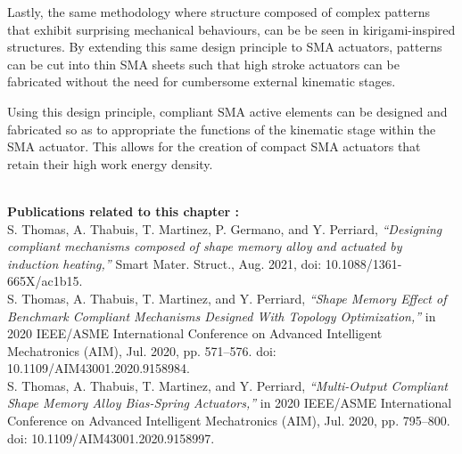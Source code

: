 Lastly, the same methodology where structure composed of complex patterns that exhibit surprising mechanical behaviours, can be be seen in kirigami-inspired structures. By extending this same design principle to SMA actuators, patterns can be cut into thin SMA sheets such that high stroke actuators can be fabricated without the need for cumbersome external kinematic stages.

Using this design principle, compliant SMA active elements can be designed and fabricated so as to appropriate the functions of the kinematic stage within the SMA actuator. This allows for the creation of compact SMA actuators that retain their high work energy density.

\vspace*{\fill}
\noindent\hrulefill \\
\textbf{\large Publications related to this chapter :}\\

S. Thomas, A. Thabuis, T. Martinez, P. Germano, and Y. Perriard, \textit{“Designing compliant mechanisms composed of shape memory alloy and actuated by induction heating,”} Smart Mater. Struct., Aug. 2021, doi: 10.1088/1361-665X/ac1b15.\\

S. Thomas, A. Thabuis, T. Martinez, and Y. Perriard, \textit{“Shape Memory Effect of Benchmark Compliant Mechanisms Designed With Topology Optimization,”} in 2020 IEEE/ASME International Conference on Advanced Intelligent Mechatronics (AIM), Jul. 2020, pp. 571–576. doi: 10.1109/AIM43001.2020.9158984.\\

S. Thomas, A. Thabuis, T. Martinez, and Y. Perriard, \textit{“Multi-Output Compliant Shape Memory Alloy Bias-Spring Actuators,”} in 2020 IEEE/ASME International Conference on Advanced Intelligent Mechatronics (AIM), Jul. 2020, pp. 795–800. doi: 10.1109/AIM43001.2020.9158997.
